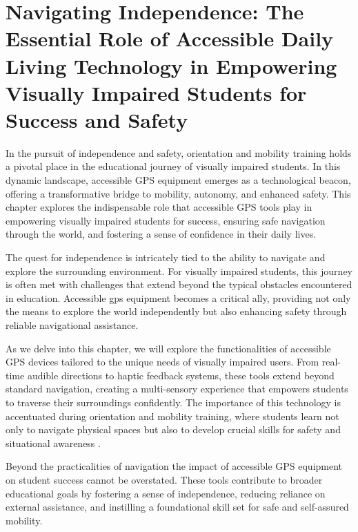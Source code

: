 \chapter{Navigating Independence: The Essential Role of Accessible Daily Living Technology in Empowering Visually Impaired Students for Success and Safety}\label{ch8:chap:accessible-daily-living}
\raggedright
In the pursuit of independence and safety, orientation and mobility training holds a pivotal place in the educational journey of visually impaired students. In this dynamic landscape, accessible GPS equipment emerges as a technological beacon, offering a transformative bridge to mobility, autonomy, and enhanced safety. This chapter explores the indispensable role that accessible GPS tools play in empowering visually impaired students for success, ensuring safe navigation through the world, and fostering a sense of confidence in their daily lives.

The quest for \gls{independence} is intricately tied to the ability to navigate and explore the surrounding environment. For visually impaired students, this journey is often met with challenges that extend beyond the typical obstacles encountered in education. Accessible \gls{gps} equipment becomes a critical ally, providing not only the means to explore the world independently but also enhancing \gls{safety} through reliable navigational assistance.

As we delve into this chapter, we will explore the functionalities of accessible GPS devices tailored to the unique needs of visually impaired users. From real-time audible directions to haptic feedback systems, these tools extend beyond standard navigation, creating a multi-sensory experience that empowers students to traverse their surroundings confidently. The importance of this technology is accentuated during orientation and mobility training, where students learn not only to navigate physical spaces but also to develop crucial skills for safety and situational awareness \supercite{OrientationMobilityInstruction}.

Beyond the practicalities of navigation the impact of accessible GPS equipment on student success cannot be overstated. These tools contribute to broader educational goals by fostering a sense of independence, reducing reliance on external assistance, and instilling a foundational skill set for safe and self-assured mobility.

